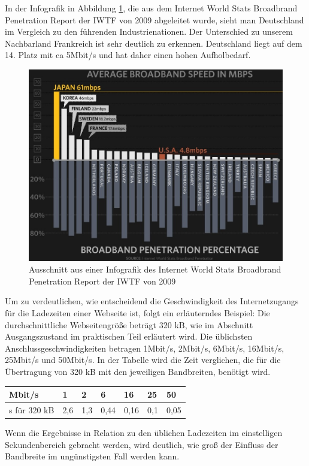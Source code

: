 In der Infografik in Abbildung \ref{fig:iwtfinfo}, die aus dem Internet World Stats Broadbrand Penetration Report der IWTF von 2009 abgeleitet wurde, sieht man Deutschland im Vergleich zu den führenden Industrienationen.\citep{Frucci2009} Der Unterschied zu unserem Nachbarland Frankreich ist sehr deutlich zu erkennen. Deutschland liegt auf dem 14. Platz mit ca 5Mbit/s und hat daher einen hohen Aufholbedarf.
\begin{figure}[!ht]
  \centering
  \includegraphics[scale=0.5]{material/worldinternetcomp.jpg}
  \caption{Ausschnitt aus einer Infografik des Internet World Stats Broadbrand Penetration Report der IWTF von 2009 }
  \label{fig:iwtfinfo}
\end{figure}
Um zu verdeutlichen, wie entscheidend die Geschwindigkeit des Internetzugangs für die Ladezeiten einer Webseite ist, folgt ein erläuterndes Beispiel:
Die durchschnittliche Webseitengröße beträgt 320 kB, wie im Abschnitt Ausgangszustand im praktischen Teil erläutert wird. Die üblichsten Anschlussgeschwindigkeiten betragen 1Mbit/s, 2Mbit/s, 6Mbit/s, 16Mbit/s, 25Mbit/s und 50Mbit/s. In der Tabelle wird die Zeit verglichen, die für die Übertragung von 320 kB mit den jeweiligen Bandbreiten, benötigt wird.
\begin{center}
    \begin{longtable}{ l | l | l | l | l | l | l}
    \hline
    Mbit/s & 1 & 2 & 6 & 16 & 25 & 50 \\ \hline
    \hline
	s für 320 kB & 2,6 & 1,3 & 0,44 & 0,16 & 0,1 & 0,05 \\ \hline
    \end{longtable}
\end{center}
Wenn die Ergebnisse in Relation zu den üblichen Ladezeiten im einstelligen Sekundenbereich gebracht werden, wird deutlich, wie groß der Einfluss der Bandbreite im ungünstigsten Fall werden kann.
